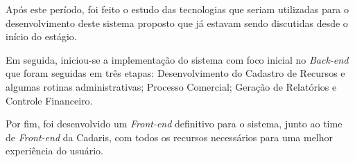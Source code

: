 \documentclass[
  12pt,				%
  openany,
  oneside,
  a4paper,			%
  english,			%
  brazil
]{article}
\numberwithin{figure}{section}
\numberwithin{table}{section}
\begin{document}
Após este período, foi feito o estudo das tecnologias que seriam utilizadas para o desenvolvimento deste sistema proposto que já estavam sendo discutidas desde o início do estágio.

Em seguida, iniciou-se a implementação do sistema com foco inicial no \textit{Back-end} que foram seguidas em três etapas: Desenvolvimento do Cadastro de Recursos e algumas rotinas administrativas; Processo Comercial; Geração de Relatórios e Controle Financeiro.

Por fim, foi desenvolvido um \textit{Front-end} definitivo para o sistema, junto ao time de \textit{Front-end} da Cadaris, com todos os recursos necessários para uma melhor experiência do usuário.



%
%
%
%
%
%



\end{document}
